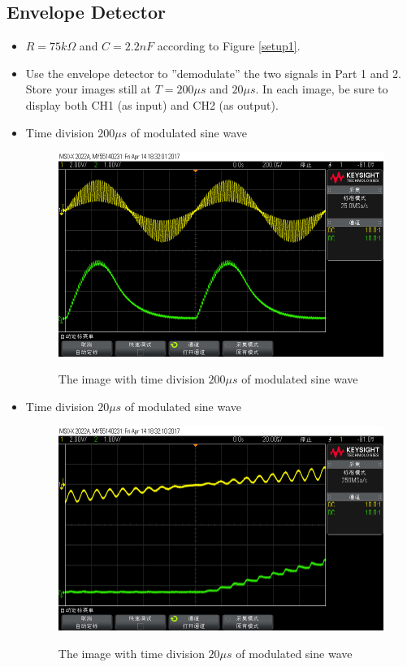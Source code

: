 \documentclass{article}
\begin{document}
\subsection{Envelope Detector}
\begin{itemize}
\item $R = 75 k\Omega$ and $C = 2.2nF$ according to Figure \ref{setup1}.
\item Use the envelope detector to ”demodulate” the two signals in Part 1 and 2. Store your images still at $T = 200\mu s$ and $20\mu s$. In each image, be sure to display both CH1 (as input) and CH2 (as output).
\item Time division $200\mu s$ of modulated sine wave
\begin{figure}[htbp]
	\centering
		\includegraphics[width=0.7\linewidth]{31.png}
		\label{fig-3-1}
	\caption{The image with time division $200\mu s$ of modulated sine wave}
\end{figure}

\item Time division $20\mu s$ of modulated sine wave
\begin{figure}[htbp]
	\centering
		\includegraphics[width=0.7\linewidth]{32.png}
		\label{fig-3-2}
	\caption{The image with time division $20\mu s$ of modulated sine wave}
\end{figure}


\end{itemize}
\end{document}
